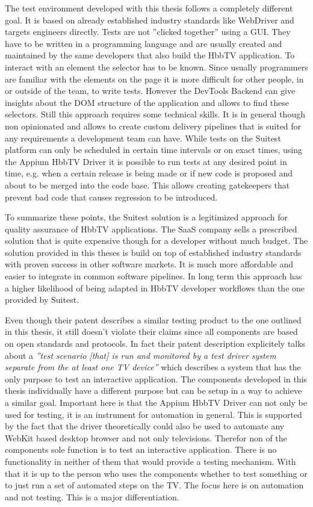 The test environment developed with this thesis follows a completely different goal. It is based on already established industry standards like WebDriver and targets engineers directly. Tests are not ''clicked together'' using a GUI. They have to be written in a programming language and are usually created and maintained by the same developers that also build the HbbTV application. To interact with an element the selector has to be known. Since usually programmers are familiar with the elements on the page it is more difficult for other people, in or outside of the team, to write tests. However the DevTools Backend can give insights about the DOM structure of the application and allows to find these selectors. Still this approach requires some technical skills. It is in general though non opinionated and allows to create custom delivery pipelines that is suited for any requirements a development team can have. While tests on the Suitest platform can only be scheduled in certain time intervals or on exact times, using the Appium HbbTV Driver it is possible to run tests at any desired point in time, e.g. when a certain release is being made or if new code is proposed and about to be merged into the code base. This allows creating gatekeepers that prevent bad code that causes regression to be introduced.

To summarize these points, the Suitest solution is a legitimized approach for quality assurance of HbbTV applications. The SaaS company sells a prescribed solution that is quite expensive though for a developer without much budget. The solution provided in this theses is build on top of established industry standards with proven success in other software markets. It is much more affordable and easier to integrate in common software pipelines. In long term this approach has a higher likelihood of being adapted in HbbTV developer workflows than the one provided by Suitest.

Even though their patent describes a similar testing product to the one outlined in this thesis, it still doesn't violate their claims since all components are based on open standards and protocols. In fact their patent description explicitely talks about a \textit{''test scenario [that] is run and monitored by a test driver system separate from the at least one TV device''} \cite{krocek2016method} which describes a system that has the only purpose to test an interactive application. The components developed in this thesis individually have a different purpose but can be setup in a way to achieve a similar goal. Important here is that the Appium HbbTV Driver can not only be used for testing, it is an instrument for automation in general. This is supported by the fact that the driver theoretically could also be used to automate any WebKit based desktop browser and not only televisions. Therefor non of the components sole function is to test an interactive application. There is no functionality in neither of them that would provide a testing mechanism. With that it is up to the person who uses the components whether to test something or to just run a set of automated steps on the TV. The focus here is on automation and not testing. This is a major differentiation.
